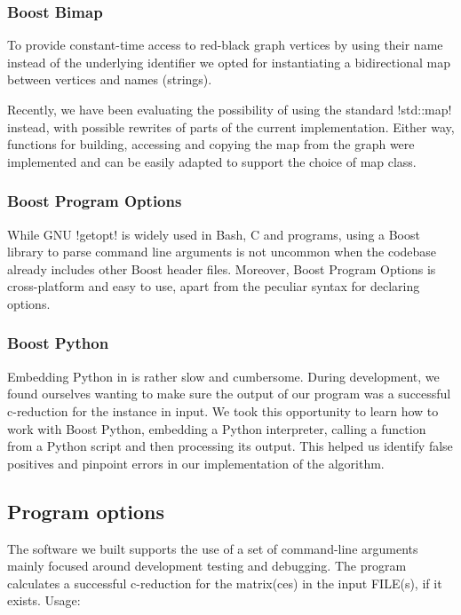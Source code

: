 \subsubsection*{Boost Bimap}

To provide constant-time access to red-black graph vertices by using their name instead of the underlying identifier we opted for instantiating a bidirectional map between vertices and names (strings).

Recently, we have been evaluating the possibility of using the standard !std::map! instead, with possible rewrites of parts of the current implementation.
Either way, functions for building, accessing and copying the map from the graph were implemented and can be easily adapted to support the choice of map class.

\subsubsection*{Boost Program Options}

While GNU !getopt! is widely used in Bash, C and \cc{} programs, using a Boost library to parse command line arguments is not uncommon when the codebase already includes other Boost header files.
Moreover, Boost Program Options is cross-platform and easy to use, apart from the peculiar syntax for declaring options.

\subsubsection*{Boost Python}

Embedding Python in \cc{} is rather slow and cumbersome.
During development, we found ourselves wanting to make sure the output of our program was a successful c-reduction for the instance in input.
We took this opportunity to learn how to work with Boost Python, embedding a Python interpreter, calling a function from a Python script and then processing its output.
This helped us identify false positives and pinpoint errors in our implementation of the algorithm.

\subsection{Program options}\label{section:program-options}

The software we built supports the use of a set of command-line arguments mainly focused around development testing and debugging.
The program calculates a successful c-reduction for the matrix(ces) in the input FILE(s), if it exists. Usage:

